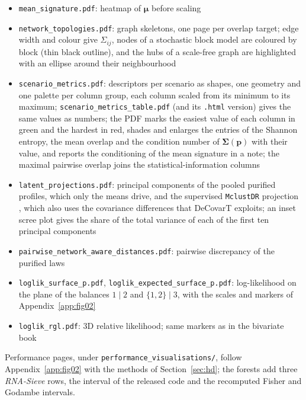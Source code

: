 \begin{itemize}
  \item \texttt{mean\_signature.pdf}: heatmap of \(\boldsymbol{\mu}\) before scaling
  \item \texttt{network\_topologies.pdf}: graph skeletons, one page per overlap target; edge width and colour give
        \(\Sigma_{ij}\), nodes of a stochastic block model are coloured by block (thin black outline), and the hubs of a scale-free graph are
        highlighted with an ellipse around their neighbourhood
  \item \texttt{scenario\_metrics.pdf}: descriptors per scenario as shapes, one geometry and one palette per column
        group, each column scaled from its minimum to its maximum; \texttt{scenario\_metrics\_table.pdf} (and its
        \texttt{.html} version) gives the same values as numbers; the PDF marks the easiest value of each column in green and
        the hardest in red, shades and enlarges the entries of the Shannon entropy, the mean overlap and the condition
        number of \(\boldsymbol{\Sigma}(\boldsymbol{p})\) with their value, and reports the conditioning of the mean
        signature in a note; the maximal pairwise overlap joins the statistical-information columns
  \item \texttt{latent\_projections.pdf}: principal components of the pooled purified profiles, which only the means
        drive, and the supervised \texttt{MclustDR} projection \cite{scruccaDimensionReductionModelbased2010a}, which
        also uses the covariance differences that DeCovarT exploits; an inset scree plot gives the share of the total variance
        of each of the first ten principal components
  \item \texttt{pairwise\_network\_aware\_distances.pdf}: pairwise discrepancy of the purified laws
  \item \texttt{loglik\_surface\_p.pdf}, \texttt{loglik\_expected\_surface\_p.pdf}: log-likelihood on the plane of the
        balances \(1\mid2\) and \(\{1,2\}\mid3\), with the scales and markers of Appendix~\ref{app:fig02}
  \item \texttt{loglik\_rgl.pdf}: 3D relative likelihood; same markers as in the bivariate book
\end{itemize}

Performance pages, under \texttt{performance\_visualisations/}, follow Appendix~\ref{app:fig02} with the methods of
Section~\ref{sec:hd}; the forests add three \emph{RNA-Sieve} rows, the interval of the released code and the
recomputed Fisher and Godambe intervals.


